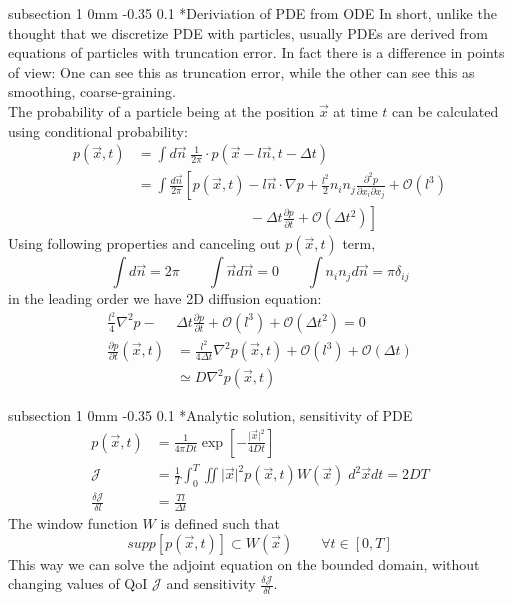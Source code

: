 \documentclass[11pt]{article}
\makeatletter
\renewcommand{\subsection}{\@startsection
{subsection}%
{1}%
{0mm}%
{-0.35\baselineskip}%
{0.1\baselineskip}%
{\normalfont\large\bfseries\color{brown}}}%
\def\Dpartial#1#2{ \frac{\partial #1}{\partial #2} }
\def\Del#1#2{ \frac{\delta #1}{\delta #2} }
\newcommand{\vn}{\vec{n}}
\newcommand{\vx}{\vec{x}}
\newcommand{\Dt}{\Delta t}
\newcommand{\cJ}{\mathcal{J}}
\makeatother
\begin{document}
\subsection*{Deriviation of PDE from ODE}
In short, unlike the thought that we discretize PDE with particles,
usually PDEs are derived from equations of particles with truncation error.
In fact there is a difference in points of view:
One can see this as truncation error, while the other can see this as smoothing, coarse-graining.\\
The probability of a particle being at the position $\vx$ at time $t$ can be calculated using conditional probability:
\begin{equation}
\begin{split}
p(\vx,t) &= \int d\vn\; \frac{1}{2\pi}\cdot p(\vx - l\vn, t-\Dt)\\
&= \int \frac{d\vn}{2\pi} \left[ p(\vx,t) - l\vn\cdot\nabla p + \frac{l^2}{2}n_in_j\frac{\partial^2p}{\partial x_i\partial x_j} + \mathcal{O}(l^3) \right.\\
&\left.\qquad\qquad\qquad\qquad -\Dt\Dpartial{p}{t} + \mathcal{O}(\Dt^2) \right]
\end{split}
\end{equation}
Using following properties and canceling out $p(\vx,t)$ term,
\begin{equation}
\int d\vn = 2\pi \qquad \int\vn d\vn = 0 \qquad \int n_in_j d\vn = \pi \delta_{ij}
\end{equation}
in the leading order we have 2D diffusion equation:
\begin{equation}
\begin{split}
\frac{l^2}{4}\nabla^2p - &\Dt\Dpartial{p}{t} + \mathcal{O}(l^3) +\mathcal{O}(\Dt^2) = 0\\
\Dpartial{p}{t}(\vx,t) &= \frac{l^2}{4\Dt}\nabla^2p(\vx,t) + \mathcal{O}(l^3) +\mathcal{O}(\Dt)\\
&\simeq D\nabla^2p(\vx,t)
\end{split}
\end{equation}

\subsection*{Analytic solution, sensitivity of PDE}
\begin{equation}
\begin{split}
p(\vx,t) &= \frac{1}{4\pi Dt}\exp\left[ -\frac{\vert\vx\vert^2}{4Dt} \right]\\
\cJ &= \frac{1}{T}\int_0^T\iint \vert\vx\vert^2 p(\vx,t)W(\vx)\;d^2\vx dt = 2DT\\
\Del{\cJ}{l} &= \frac{Tl}{\Dt}
\end{split}
\end{equation}
The window function $W$ is defined such that
\begin{equation*}
supp\left[ p(\vx,t) \right] \subset W(\vx)\qquad\forall t\in[0,T]
\end{equation*}
This way we can solve the adjoint equation on the bounded domain, without changing values of QoI $\cJ$ and sensitivity $\Del{\cJ}{l}$.
\end{document}
